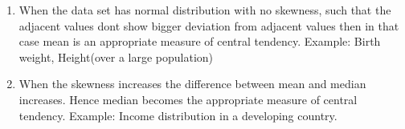 \begin{enumerate}
\item When the data set has normal distribution with no skewness, such that the adjacent values dont show bigger deviation from adjacent values then in that case mean is an appropriate measure of central tendency.
Example: Birth weight, Height(over a large population)
\item When the skewness increases the difference between mean and median increases. Hence median becomes the appropriate measure of central tendency. 
Example: Income distribution in a developing country.

\end{enumerate}
